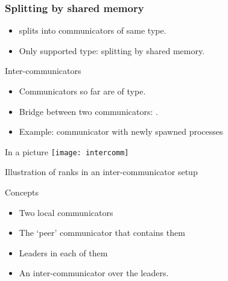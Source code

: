 \begin{frame}[containsverbatim]\frametitle{Splitting by shared memory}
  \begin{itemize}
  \item
     splits into communicators of same type.
  \item Only supported type:  splitting by
    shared memory.
  \end{itemize}

\end{frame}

\begin{mpithree}
\begin{frame}{Inter-communicators}
\label{sl:comm-inter}
  \begin{itemize}
  \item Communicators so far are of  type.
  \item Bridge between two communicators: .
  \item Example: communicator with newly spawned processes
  \end{itemize}  
\end{frame}
\end{mpithree}

\begin{mpithree}
\begin{frame}{In a picture}
  \label{sl:intercomm-picture}
  \texttt{[image: intercomm]}

  Illustration of ranks in an inter-communicator setup
  \tiny{}
\end{frame}
\end{mpithree}

\begin{mpithree}
\begin{frame}{Concepts}
  \label{sl:intercomm-concepts}
  \begin{itemize}
  \item Two local communicators
  \item The `peer' communicator that contains them
  \item Leaders in each of them
  \item An inter-communicator over the leaders.
  \end{itemize}
\end{frame}
\end{mpithree}

